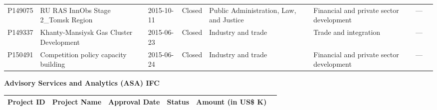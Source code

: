 \documentclass{article}\usepackage[]{graphicx}\usepackage[]{color}
\begin{document}
\begin{minipage}[b]{0.99\textwidth}
\begin{minipage}[b]{0.99\textwidth}
\begin{minipage}[c]{0.99\textwidth}
{\begin{tabular}{l>{\raggedright}p{1in}ll>{\raggedright}p{1in}>{\raggedright}p{1in}rl}
  P149075 & RU RAS InnObs Stage 2\_Tomsk Region & 2015-10-11 & Closed & Public Administration, Law, and Justice & Financial and private sector development & --- &  \\ 
  P149337 & Khanty-Mansiysk Gas Cluster Development & 2015-06-23 & Closed & Industry and trade & Trade and integration & --- &  \\ 
  P150491 & Competition policy capacity building & 2015-06-24 & Closed & Industry and trade & Financial and private sector development & --- &  \\ 
  \end{tabular}
}

     \vspace*{0.5cm}
     \end{minipage}
     
     \begin{minipage}[c]{0.99\textwidth} %
     \raggedright{\color{white!30!blue} \textbf{\large Advisory Services and Analytics (ASA) IFC}}
     \vspace*{0.5cm}
     
{\small
\begin{tabular}{l>{\raggedright}p{2.5in}llrl}
 Project ID & Project Name & Approval Date & Status & Amount (in US\$ K) &  \\ 
  \hline
\end{tabular}
}

     \vspace*{0.5cm}
     \end{minipage}
     
    \end{minipage}
\end{minipage}
 
\end{document}
